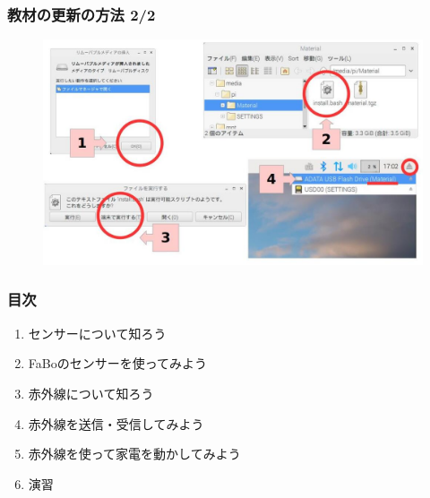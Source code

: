 \begin{frame}[fragile]
    \frametitle{教材の更新の方法 2/2}
    \begin{center}
        \begin{figure}
            \includegraphics[width=\textwidth]{images/slide/how_to_update.jpg}
        \end{figure}
    \end{center}
\end{frame}

\begin{frame}[fragile]
    \frametitle{目次}
    \begin{enumerate}
        \item センサーについて知ろう
        \item FaBoのセンサーを使ってみよう
        \item 赤外線について知ろう
        \item 赤外線を送信・受信してみよう
        \item 赤外線を使って家電を動かしてみよう
        \item 演習
    \end{enumerate}
\end{frame}
